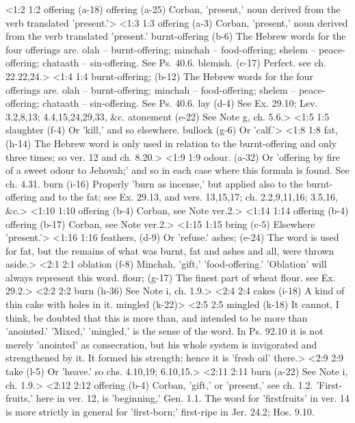 <1:2 1:2  offering (a-18)  offering (a-25)
  Corban, 'present,' noun derived from the verb translated 'present.'>
<1:3 1:3  offering (a-3)  Corban, 'present,' noun derived from the verb translated  'present.'
  burnt-offering (b-6)  The Hebrew words for the four offerings are. olah --  burnt-offering; minchah -- food-offering; shelem --  peace-offering; chataath -- sin-offering. See Ps. 40.6.
  blemish. (c-17)  Perfect. see ch. 22.22,24.>
<1:4 1:4  burnt-offering; (b-12)  The Hebrew words for the four offerings are. olah --  burnt-offering; minchah -- food-offering; shelem --  peace-offering; chataath -- sin-offering. See Ps. 40.6.
  lay (d-4)  See Ex. 29.10; Lev. 3.2,8,13; 4.4,15,24,29,33, &c.
  atonement (e-22)  See Note g, ch. 5.6.>
<1:5 1:5  slaughter (f-4)  Or 'kill,' and so elsewhere.
  bullock (g-6)  Or 'calf.'>
<1:8 1:8  fat, (h-14)  The Hebrew word is only used in relation to the  burnt-offering and only three times; so ver. 12 and ch. 8.20.>
<1:9 1:9  odour. (a-32)  Or 'offering by fire of a sweet odour to Jehovah;' and so in  each case where this formula is found. See ch. 4.31.
  burn (i-16)  Properly 'burn as incense,' but applied also to the  burnt-offering and to the fat; see Ex. 29.13, and vers.  13,15,17; ch. 2.2,9,11,16; 3.5,16, &c.>
<1:10 1:10  offering (b-4)  Corban, see Note ver.2.>
<1:14 1:14  offering (b-4)  offering (b-17)
  Corban, see Note ver.2.>
<1:15 1:15  bring (c-5)  Elsewhere 'present.'>
<1:16 1:16  feathers, (d-9)  Or 'refuse.'
  ashes; (e-24)  The word is used for fat, but the remains of what was burnt,  fat and ashes and all, were thrown aside.>
<2:1 2:1  oblation (f-8)  Minchah, 'gift,' 'food-offering.' 'Oblation' will always  represent this word.
  flour; (g-17)  The finest part of wheat flour. see Ex. 29.2.>
<2:2 2:2  burn (h-36)  See Note i, ch. 1.9.>
<2:4 2:4  cakes (i-18)  A kind of thin cake with holes in it.  mingled (k-22)>
<2:5 2:5  mingled (k-18)  It cannot, I think, be doubted that this is more than, and  intended to be more than 'anointed.' 'Mixed,' 'mingled,' is the  sense of the word. In Ps. 92.10 it is not merely 'anointed' as  consecration, but his whole system is invigorated and  strengthened by it. It formed his strength; hence it is 'fresh  oil' there.>
<2:9 2:9  take (l-5)  Or 'heave.' so chs. 4.10,19; 6.10,15.>
<2:11 2:11  burn (a-22)  See Note i, ch. 1.9.>
<2:12 2:12  offering (b-4)  Corban, 'gift,' or 'present,' see ch. 1.2. 'First-fruits,'  here in ver. 12, is 'beginning,' Gen. 1.1. The word for  'firstfruits' in ver. 14 is more strictly in general for  'first-born;' first-ripe in Jer. 24.2; Hos. 9.10.
